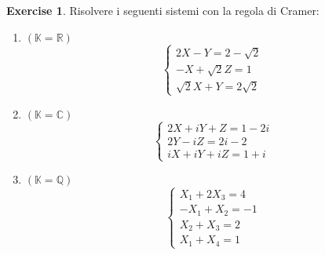 \documentclass{article}
\theoremstyle{plain}
\theoremstyle{definition}
\newtheorem{xca}[exmp]{Exercise}
\theoremstyle{remark}
\begin{document}
\vspace{10pt}

\begin{bxthm}
\begin{xca}
    Risolvere i seguenti sistemi con la regola di Cramer:
    \begin{enumerate}
        \item $(\mathbb{K}=\mathbb{R})$
        \[\begin{cases}
            2X-Y=2-\sqrt{2}\\
            -X+\sqrt{2}Z=1\\
            \sqrt{2}X+Y=2\sqrt{2}
        \end{cases}\]
        \item $(\mathbb{K}=\mathbb{C})$
        \[\begin{cases}
            2X+iY+Z=1-2i\\
            2Y-iZ=2i-2\\
            iX+iY+iZ=1+i
        \end{cases}\]
        \item $(\mathbb{K}=\mathbb{Q})$
        \[\begin{cases}
            X_1+2X_3=4\\
            -X_1+X_2=-1\\
            X_2+X_3=2\\
            X_1+X_4=1
        \end{cases}\]
    \end{enumerate}
\end{xca}
\end{bxthm}
\end{document}
